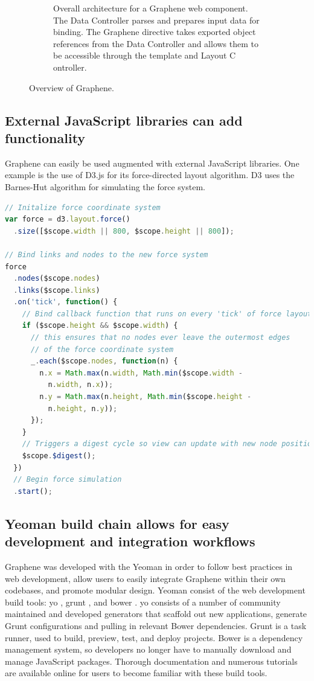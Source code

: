 \begin{figure}
\begin{subfigure}[b]{\textwidth}
    \caption{Overall architecture for a Graphene web component. The Data Controller parses and prepares input data for binding. 
      The Graphene directive takes exported object references from the Data Controller and allows them to be accessible through the template and Layout C      ontroller.}
    \label{Figure:graphene-diagram}
  \end{subfigure}
  \caption{Overview of Graphene.}
  \label{Figure:graphene}
\end{figure}

\subsection{External JavaScript libraries can add functionality}
Graphene can easily be used augmented with external JavaScript libraries.
One example is the use of D3.js \autocite{bostock2014d3} for its force-directed layout algorithm.
D3 uses the Barnes-Hut algorithm for simulating the force system. \autocite{bostock2011d3}

\begin{lstlisting}[language=JavaScript]
// Initalize force coordinate system
var force = d3.layout.force()
  .size([$scope.width || 800, $scope.height || 800]);

// Bind links and nodes to the new force system
force
  .nodes($scope.nodes)
  .links($scope.links)
  .on('tick', function() {
    // Bind callback function that runs on every 'tick' of force layout
    if ($scope.height && $scope.width) {
      // this ensures that no nodes ever leave the outermost edges
      // of the force coordinate system
      _.each($scope.nodes, function(n) {
        n.x = Math.max(n.width, Math.min($scope.width -
          n.width, n.x));
        n.y = Math.max(n.height, Math.min($scope.height -
          n.height, n.y));
      });
    }
    // Triggers a digest cycle so view can update with new node positions
    $scope.$digest();
  })
  // Begin force simulation
  .start();
\end{lstlisting}

\subsection{Yeoman build chain allows for easy development and integration workflows}

Graphene was developed with the Yeoman in order to follow best practices in web development, allow users to easily integrate Graphene within their own codebases, and promote modular design.
Yeoman consist of the web development build tools: yo \autocite{yeoman2014yo}, grunt \autocite{alman2014grunt}, and bower \autocite{twitter2014bower}.
yo consists of a number of community maintained and developed generators that scaffold out new applications, generate Grunt configurations and pulling in relevant Bower dependencies.
Grunt is a task runner, used to build, preview, test, and deploy projects.
Bower is a dependency management system, so developers no longer have to manually download and manage JavaScript packages.
Thorough documentation and numerous tutorials are available online for users to become familiar with these build tools.

